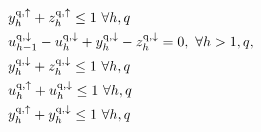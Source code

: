 \documentclass[conference]{IEEEtran}
\begin{document}
\begin{subequations}
\begin{align}
        \  & y_{h}^{\rm{q},\uparrow} + z_{h}^{\rm{q},\uparrow} \leq 1 \                                                             \forall{h,q}                                                                                                                                                                     \label{aux:2}                                                                                                                                                                                                                           \\
        \  & u_{h-1}^{\rm{q},\downarrow} - u_{h}^{\rm{q},\downarrow} + y_{h}^{\rm{q},\downarrow} - z_{h}^{\rm{q},\downarrow} = 0, \                                                                                                                                                                                                                                                    \forall{h>1,q},                                                                                                                                        \label{aux:3} \\
        \  & y_{h}^{\rm{q},\downarrow} + z_{h}^{\rm{q},\downarrow} \leq 1 \                                                         \forall{h,q}                                                                                                                                                                     \label{aux:4}                                                                                                                                                                                                                           \\
        \  & u_{h}^{\rm{q},\uparrow} + u_{h}^{\rm{q},\downarrow} \leq 1 \                                                           \forall{h,q}                                                                                                                                                                     \label{aux:5}                                                                                                                                                                                                                           \\
        \  & y_{h}^{\rm{q},\uparrow} + y_{h}^{\rm{q},\downarrow} \leq 1 \                                                           \forall{h,q}                                                                                                                                                                                   \label{aux:6}                                                                                                                                                                                                             \\

\end{align}
\end{subequations}
\end{document}
